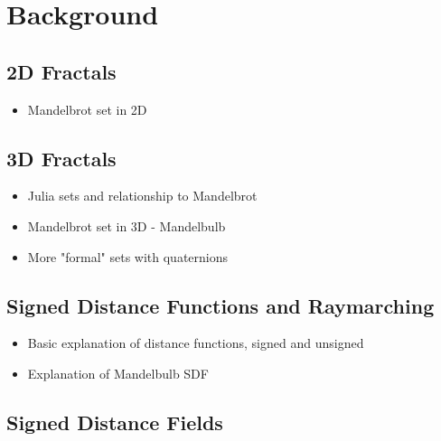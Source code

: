 \chapter{Background}
\label{chapter1}

\section{2D Fractals}

\begin{itemize}
	\item Mandelbrot set in 2D
\end{itemize}

\section{3D Fractals}
\cite{aron2009mandelbulb}
\begin{itemize}
	\item Julia sets and relationship to Mandelbrot
	\item Mandelbrot set in 3D - Mandelbulb
	\item More "formal" sets with quaternions
\end{itemize}

\section{Signed Distance Functions and Raymarching}

\begin{itemize}
	\item Basic explanation of distance functions, signed and unsigned
	\item Explanation of Mandelbulb SDF
\end{itemize}

\section{Signed Distance Fields}